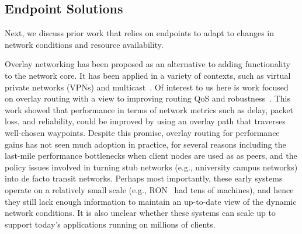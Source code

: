 \subsection{Endpoint Solutions}
Next, we discuss prior work that relies on endpoints to adapt to changes
in network conditions and resource availability.

Overlay networking has been proposed as an alternative to adding functionality 
to the network core. It has been applied in a variety of contexts, such as 
virtual private networks (VPNs) and multicast~\cite{esm,ALMI-USITS01,
Multicast-Sigcomm02}. 
Of interest to us here is work focused on overlay routing with a view to improving 
routing QoS and robustness~\cite{Detour-Sigcomm99,RON-SOSP01}. 
This work showed that performance in terms of network metrics such as 
delay, packet loss, and reliability, could be improved by using 
an overlay path that traverses well-chosen waypoints. 
Despite this promise,  overlay routing for performance gains has not seen 
much adoption in practice, for several reasons including the last-mile 
performance bottlenecks when client nodes are used as as peers, and 
the policy issues involved in turning stub networks (e.g., university campus 
networks) into de facto transit networks. 
Perhaps most importantly, these early systems operate on a relatively 
small scale (e.g., RON~\cite{RON-SOSP01} 
had tens of machines), and hence they still lack 
enough information to maintain an up-to-date view of the dynamic network 
conditions. It is also unclear whether these systems
can scale up to support today's applications running on millions of 
clients.



